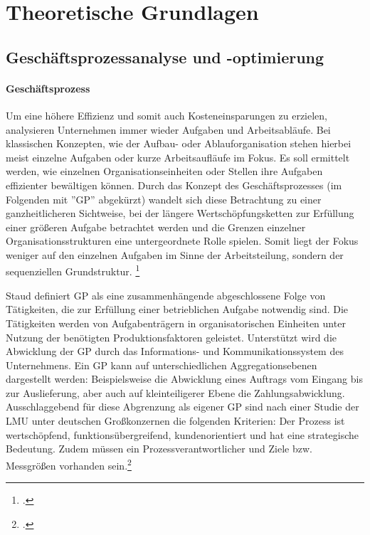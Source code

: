 \chapter{Theoretische Grundlagen}


\section{Geschäftsprozessanalyse und -optimierung}

\subsubsection{Geschäftsprozess}\label{sec:Kapitel211}

Um eine höhere Effizienz und somit auch Kosteneinsparungen  zu erzielen, analysieren Unternehmen immer wieder Aufgaben und Arbeitsabläufe. Bei klassischen Konzepten, wie der Aufbau- oder Ablauforganisation stehen hierbei meist einzelne Aufgaben oder kurze Arbeitsaufläufe im Fokus. Es soll ermittelt werden, wie einzelnen Organisationseinheiten oder Stellen ihre Aufgaben effizienter bewältigen können. Durch das Konzept des Geschäftsprozesses (im Folgenden mit ''GP'' abgekürzt) wandelt sich diese Betrachtung zu einer ganzheitlicheren Sichtweise, bei der längere Wertschöpfungsketten zur Erfüllung einer grö\ss eren Aufgabe betrachtet werden und die Grenzen einzelner Organisationsstrukturen eine untergeordnete Rolle spielen. Somit liegt der Fokus weniger auf den einzelnen Aufgaben im Sinne der Arbeitsteilung, sondern der sequenziellen Grundstruktur. \footcite[Vgl.][S. 5]{theorie_staud_geschäftsprozessanalyse_2006}

Staud definiert GP als eine zusammenhängende abgeschlossene Folge von Tätigkeiten, die zur Erfüllung einer betrieblichen Aufgabe notwendig sind. Die Tätigkeiten werden von Aufgabenträgern in organisatorischen Einheiten unter Nutzung der benötigten Produktionsfaktoren geleistet. Unterstützt wird die Abwicklung der GP durch das Informations- und Kommunikationssystem des Unternehmens. \parencite[Vgl.][S. 9]{theorie_staud_geschäftsprozessanalyse_2006} Ein GP kann auf unterschiedlichen Aggregationsebenen dargestellt werden: Beispielsweise die Abwicklung eines Auftrags vom Eingang bis zur Auslieferung, aber auch auf kleinteiligerer Ebene die Zahlungsabwicklung. Ausschlaggebend für diese Abgrenzung als eigener GP sind nach einer Studie der LMU unter deutschen Gro\ss konzernen die folgenden Kriterien: Der Prozess ist wertschöpfend, funktionsübergreifend, kundenorientiert und hat eine strategische Bedeutung. Zudem müssen ein Prozessverantwortlicher und Ziele bzw. Messgrö\ss en vorhanden sein.\footcite[Vgl.][S. 19]{theorie_koch_studie_kriterien_geschäftsprozess_2003} 


